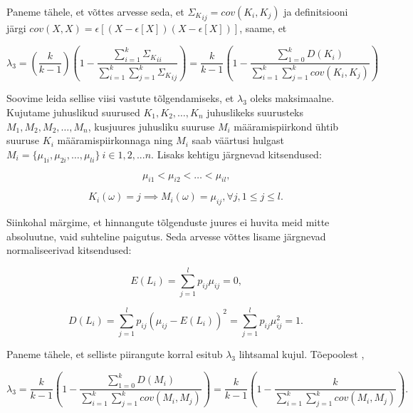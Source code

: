 \documentclass[a4paper,12pt,oneside]{article}
\numberwithin{equation}{section}
\theoremstyle{definition}
\begin{document}
Paneme tähele, et võttes arvesse  seda, et ${\Sigma_K}_{ij} = cov(K_i,K_j)$ ja  definitsiooni järgi $cov(X,X) = \epsilon \left[ (X - \epsilon \left[X \right]) (X - \epsilon \left[X \right]) \right]$, saame, et 

 
\begin{equation*}
\lambda_3 = (\frac{k}{k-1})( 1 - \frac{\sum \limits_{i=1}^k {\Sigma_K}_{ii} }{ \sum \limits_{i=1}^k \sum \limits_{j=1}^k {\Sigma_K}_{ij}})= \frac{k}{k-1}\left(1 - \frac
{\sum \limits_{1=0}^k D(K_i)}{\sum \limits_{i=1}^k \sum \limits_{j=1}^k cov(K_i,K_j)}\right)
\end{equation*}

Soovime leida sellise viisi vastute tõlgendamiseks, et $\lambda_3$ oleks maksimaalne. Kujutame juhuslikud suurused $K_1,K_2,\ldots,K_n$ juhuslikeks suurusteks $M_1, M_2,M_2,\ldots,M_n$, kusjuures juhusliku suuruse $M_i$ määramispiirkond ühtib suuruse $K_i$ määramispiirkonnaga ning $M_i$ saab väärtusi hulgast $M_i = \lbrace \mu_{1i},\mu_{2i},\ldots,\mu_{li} \rbrace ~ i \in {1,2,...n}$. Lisaks kehtigu järgnevad kitsendused: 

\begin{equation*}
\mu_{i1} < \mu_{i2}  < \ldots  < \mu_{il} \text{,}
\end{equation*}


\begin{equation*}
K_i(\omega) = j \implies M_i(\omega) = \mu_{ij} , \forall j ,  1 \leq j \leq l \text{.}
\end{equation*}

Siinkohal märgime, et hinnangute tõlgenduste juures ei huvita meid mitte absoluutne, vaid suhteline paigutus. Seda arvesse võttes lisame järgnevad normaliseerivad kitsendused:


\begin{equation}
\label{eq:e_is_0}
E(L_i) = \sum \limits_{j=1}^l p_{ij} \mu_{ij}=0 \text{,}
\end{equation}

\begin{equation}
D(L_i) = \sum \limits_{j=1}^l p_{ij} (\mu_{ij} - E(L_i))^2 = \sum \limits_{j=1}^l p_{ij} \mu_{ij}^2 =  1  \text{.}
\end{equation}


Paneme tähele, et selliste piirangute korral  esitub $\lambda_3$ lihtsamal kujul. Tõepoolest , 

\begin{equation*}
\lambda_3 = \frac{k}{k-1}\left(1 - \frac
{\sum \limits_{1=0}^k D(M_i)}{\sum \limits_{i=1}^k \sum \limits_{j=1}^k cov(M_i,M_j)}\right) = 
\frac{k}{k-1}\left(1 - \frac
{k}{\sum \limits_{i=1}^k \sum \limits_{j=1}^k cov(M_i,M_j)}\right) \text{.}
\end{equation*}
\end{document}
